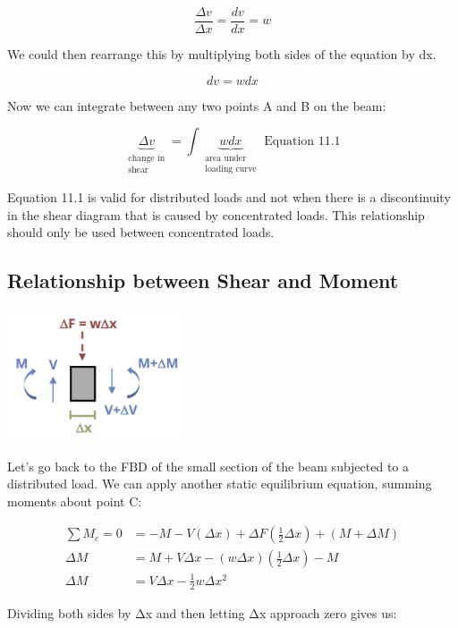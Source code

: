 \documentclass[
  letterpaper,
  DIV=11,
  numbers=noendperiod]{scrreprt}
\begin{document}
\[
\frac{\Delta v}{\Delta x}=\frac{d v}{d x}=w
\]

We could then rearrange this by multiplying both sides of the equation
by dx.

\[
d v=w d x
\]

Now we can integrate between any two points A and B on the beam:

\[
\underbrace{\Delta v}_{\substack{\text{change in} \\ \text{shear}}}=\int\underbrace{w d x}_{\substack{\text{area under} \\ \text {loading curve}}} \text{ Equation 11.1}
\]

Equation 11.1 is valid for distributed loads and not when there is a
discontinuity in the shear diagram that is caused by concentrated loads.
This relationship should only be used between concentrated loads.

\subsection{Relationship between Shear and
Moment}\label{relationship-between-shear-and-moment}

\begin{center}
\includegraphics[width=2.07292in,height=\textheight]{images/CH7 PNGs/figure 7.5.png}
\end{center}

Let's go back to the FBD of the small section of the beam subjected to a
distributed load. We can apply another static equilibrium equation,
summing moments about point C:

\[
\begin{aligned}
\sum M_c=0 & =-M-V(\Delta x)+\Delta F\left(\frac{1}{2} \Delta x\right)+(M+\Delta M) \\
\Delta M & =M+V \Delta x-(w \Delta x)\left(\frac{1}{2} \Delta x\right)-M \\
\Delta M & =V \Delta x-\frac{1}{2} w \Delta x^2
\end{aligned}
\]

Dividing both sides by Δx and then letting Δx approach zero gives us:
\end{document}
